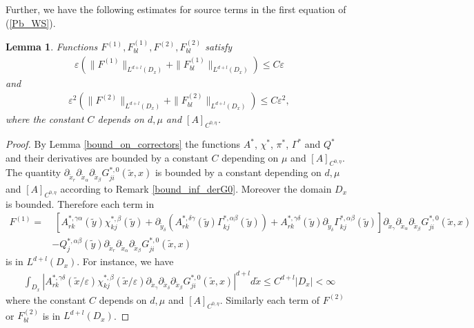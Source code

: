\documentclass[11pt, reqno]{amsart}
\newtheorem{lemma}[theorem]{Lemma}
\theoremstyle{definition}
\theoremstyle{remark}
\numberwithin{equation}{section}
\begin{document}
	\noindent	Further, we have the following estimates for  source terms in the first equation of (\ref{Pb_WS}).
	\begin{lemma}
		Functions 	$ F^{(1)},  F^{(1)}_{bl},  F^{(2)},  F^{(2)}_{bl}$ satisfy
		\begin{align*}
			\varepsilon\left( \| F^{(1)}\|_{L^{d+l}(D_x)} +\| F^{(1)}_{bl}\|_{L^{d+l}(D_x)}\right) \leq C\varepsilon
		\end{align*}
		and 
		\begin{align*}
			\varepsilon^2\left( \| F^{(2)}\|_{L^{d+l}(D_x)} +\| F^{(2)}_{bl}\|_{L^{d+l}(D_x)}\right)\leq C\varepsilon^2,
		\end{align*}	where the constant $C$ depends on $ d,\mu$ and $[A]_{C^{0,\eta}}$.
	\end{lemma}	
	\begin{proof}[Proof]
		By Lemma \ref{bound_on_correctors} the functions $A^*$, $\chi^*$, $\pi^*$, $\Gamma^*$ and $Q^*$ and their derivatives are bounded by a constant $C$ depending on $\mu$ and $[A]_{C^{0,\eta}}$. The quantity $\partial_{\tilde{x}_r}\partial_{ \tilde{x}_{\alpha}} \partial_{\tilde{x}_{\beta}} G_{ji}^{*,0}  (\tilde{x},x)$ is bounded by a constant depending on $d,\mu$ and $[A]_{C^{0,\eta}}$ according to Remark \ref{bound_inf_derG0}.	Moreover the domain $D_x$ is bounded. Therefore each term in
		\begin{align}
			F^{(1)}=& \;  [A^{*,\gamma\alpha}_{rk}(\tilde{y})	\chi^{*,\beta}_{kj}(\tilde{y})+ \partial_{\tilde{y}_\delta} ( A^{*,\delta\gamma}_{rk}(\tilde{y})\Gamma^{*,\alpha\beta}_{kj}(\tilde{y}))+ A^{*,\gamma\delta}_{rk}(\tilde{y})\partial_{\tilde{y}_\delta}\Gamma^{*,\alpha\beta}_{kj}(\tilde{y})] \partial_{\tilde{x}_\gamma}\partial_{ \tilde{x}_{\alpha}} \partial_{\tilde{x}_{\beta}} G_{ji}^{*,0}  (\tilde{x},x)\nonumber\\&		-    Q^{*,\alpha\beta}_{j}(\tilde{y})\partial_{\tilde{x}_r}\partial_{ \tilde{x}_{\alpha}} \partial_{\tilde{x}_{\beta}} G_{ji}^{*,0}  (\tilde{x},x)
		\end{align}
		is in $L^{d+l}(D_x)$. For instance,  we have 
		\begin{align*}
			\int_{D_x} \left|A^{*,\gamma\delta}_{rk}(\tilde{x}/\varepsilon) 	\chi^{*,\beta}_{kj}(\tilde{x}/\varepsilon) \partial_{\tilde{x}_\gamma}\partial_{\tilde{x}_\delta}\partial_{\tilde{x}_{\beta}} G_{ji}^{*,0}  (\tilde{x},x)\right|^{d+l} d\tilde{x}\leq C^{d+l}  |D_x| <\infty
		\end{align*}	where the constant $C$ depends on  $d,\mu$ and $[A]_{C^{0,\eta}}$.	Similarly each term of  $F^{(2)}$ or $F^{(2)}_{bl}$ is in 	 $L^{d+l}(D_x)$. 
	\end{proof}	
	
\end{document}
